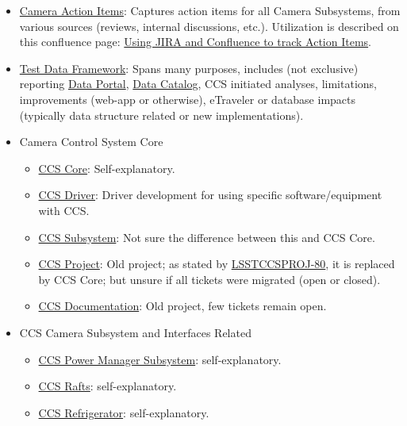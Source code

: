 \begin{itemize}
	\item \href{https://jira.slac.stanford.edu/browse/LCAI}{Camera Action Items}: Captures action items for all Camera Subsystems, from various sources (reviews, internal discussions, etc.). Utilization is described on this confluence page: \href{https://confluence.slac.stanford.edu/pages/viewpage.action?pageId=130884357}{Using JIRA and Confluence to track Action Items}.
	\item \href{https://jira.slac.stanford.edu/browse/LSSTTD}{Test Data Framework}:  Spans many purposes, includes (not exclusive) reporting \href{http://lsst-camera.slac.stanford.edu/DataPortal/}{Data Portal}, \href{http://srs.slac.stanford.edu/DataCatalog/?experiment=LSST-CAMERA}{Data Catalog}, CCS initiated analyses, limitations, improvements (web-app or otherwise), eTraveler or database impacts (typically data structure related or new implementations).
	\item Camera Control System Core
	\begin{itemize}
		\item \href{https://jira.slac.stanford.edu/browse/LSSTCCS}{CCS Core}:  Self-explanatory.
		\item \href{https://jira.slac.stanford.edu/browse/LSSTCCSDRIVER}{CCS Driver}:  Driver development for using specific software/equipment with CCS.
		\item \href{https://jira.slac.stanford.edu/browse/LSSTCCSSUB}{CCS Subsystem}:   Not sure the difference between this and CCS Core.
		\item \href{https://jira.slac.stanford.edu/browse/LSSTCCSPROJ}{CCS Project}:  Old project; as stated by \href{https://jira.slac.stanford.edu/browse/LSSTCCSPROJ-80}{LSSTCCSPROJ-80}, it is replaced by CCS Core; but unsure if all tickets were migrated (open or closed).
		\item \href{https://jira.slac.stanford.edu/browse/LSSTCCSDOC}{CCS Documentation}:  Old project, few tickets remain open.
	\end{itemize}
	\item CCS Camera Subsystem and Interfaces Related
		\begin{itemize}
		\item \href{https://jira.slac.stanford.edu/browse/LSSTCCSPOWER}{CCS Power Manager Subsystem}:  self-explanatory.
		\item \href{https://jira.slac.stanford.edu/browse/LSSTCCSRAFTS}{CCS Rafts}:  self-explanatory.
		\item \href{https://jira.slac.stanford.edu/browse/LSSTCCSREFRIG}{CCS Refrigerator}:  self-explanatory.

\end{itemize}
\end{itemize}
